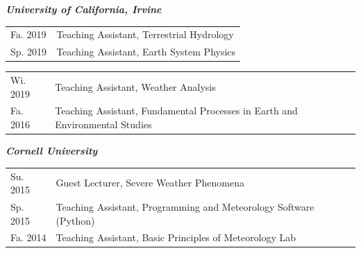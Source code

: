 \documentclass[margin,line,palatino,courier,10pt]{res}
\begin{document}
\begin{resume}
\textit{\textbf{University of California, Irvine}}
\vspace*{0.05in}\\
\begin{tabular}{@{}p{0.9in}p{4in}}
Fa. 2019 & Teaching Assistant, Terrestrial Hydrology\\
Sp. 2019 & Teaching Assistant, Earth System Physics\\
\end{tabular}
\begin{tabular}{@{}p{0.9in}p{4in}}
Wi. 2019 & Teaching Assistant, Weather Analysis\\
Fa. 2016 & Teaching Assistant, Fundamental Processes in Earth and Environmental Studies\\
\end{tabular}

\textit{\textbf{Cornell University}}
\vspace*{0.05in}\\
\begin{tabular}{@{}p{0.9in}p{4in}}
Su. 2015 & Guest Lecturer, Severe Weather Phenomena\\
Sp. 2015 & Teaching Assistant, Programming and Meteorology Software (Python)\\
Fa. 2014 & Teaching Assistant, Basic Principles of Meteorology Lab\\
\end{tabular}


\end{resume}
\end{document}
